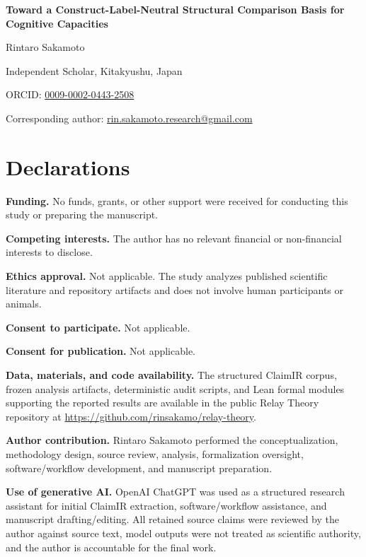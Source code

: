 \documentclass[11pt]{article}
\begin{document}
\begin{center}
{\LARGE\bfseries Toward a Construct-Label-Neutral Structural Comparison Basis for Cognitive Capacities\par}
\vspace{1.5em}

{\large Rintaro Sakamoto\par}
Independent Scholar, Kitakyushu, Japan\par
ORCID: \href{https://orcid.org/0009-0002-0443-2508}{0009-0002-0443-2508}\par
Corresponding author: \href{mailto:rin.sakamoto.research@gmail.com}{rin.sakamoto.research@gmail.com}\par
\end{center}

\vspace{2em}

\section*{Declarations}

\textbf{Funding.} No funds, grants, or other support were received for conducting this study or preparing the manuscript.

\textbf{Competing interests.} The author has no relevant financial or non-financial interests to disclose.

\textbf{Ethics approval.} Not applicable. The study analyzes published scientific literature and repository artifacts and does not involve human participants or animals.

\textbf{Consent to participate.} Not applicable.

\textbf{Consent for publication.} Not applicable.

\textbf{Data, materials, and code availability.} The structured ClaimIR corpus, frozen analysis artifacts, deterministic audit scripts, and Lean formal modules supporting the reported results are available in the public Relay Theory repository at \url{https://github.com/rinsakamo/relay-theory}.

\textbf{Author contribution.} Rintaro Sakamoto performed the conceptualization, methodology design, source review, analysis, formalization oversight, software/workflow development, and manuscript preparation.

\textbf{Use of generative AI.} OpenAI ChatGPT was used as a structured research assistant for initial ClaimIR extraction, software/workflow assistance, and manuscript drafting/editing. All retained source claims were reviewed by the author against source text, model outputs were not treated as scientific authority, and the author is accountable for the final work.
\end{document}
